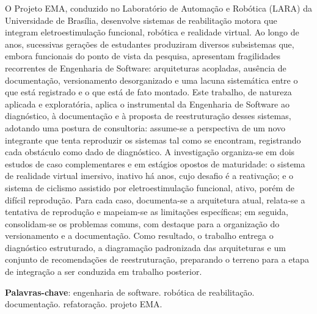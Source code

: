 \begin{resumo}
O Projeto EMA, conduzido no Laboratório de Automação e Robótica (LARA) da Universidade de
Brasília, desenvolve sistemas de reabilitação motora que integram eletroestimulação
funcional, robótica e realidade virtual. Ao longo de anos, sucessivas gerações
de estudantes produziram diversos subsistemas que, embora funcionais do ponto de vista da
pesquisa, apresentam fragilidades recorrentes de Engenharia de Software: arquiteturas
acopladas, ausência de documentação, versionamento desorganizado e uma lacuna sistemática
entre o que está registrado e o que está de fato montado. Este trabalho, de natureza
aplicada e exploratória, aplica o instrumental da Engenharia de Software ao diagnóstico,
à documentação e à proposta de reestruturação desses sistemas, adotando uma postura de
consultoria: assume-se a perspectiva de um novo integrante que tenta reproduzir os sistemas
tal como se encontram, registrando cada obstáculo como dado de diagnóstico. A investigação
organiza-se em dois estudos de caso complementares e em estágios opostos de maturidade: o
sistema de realidade virtual imersivo, inativo há anos, cujo desafio é a
reativação; e o sistema de ciclismo assistido por eletroestimulação funcional, ativo, porém
de difícil reprodução. Para cada caso, documenta-se a arquitetura atual, relata-se a
tentativa de reprodução e mapeiam-se as limitações específicas; em seguida, consolidam-se os
problemas comuns, com destaque para a organização do versionamento e a documentação. Como
resultado, o trabalho entrega o diagnóstico estruturado, a diagramação padronizada das
arquiteturas e um conjunto de recomendações de reestruturação, preparando o terreno para a
etapa de integração a ser conduzida em trabalho posterior.

\vspace{\onelineskip}

\noindent
\textbf{Palavras-chave}: engenharia de software. robótica de reabilitação. documentação. refatoração. projeto EMA.
\end{resumo}
